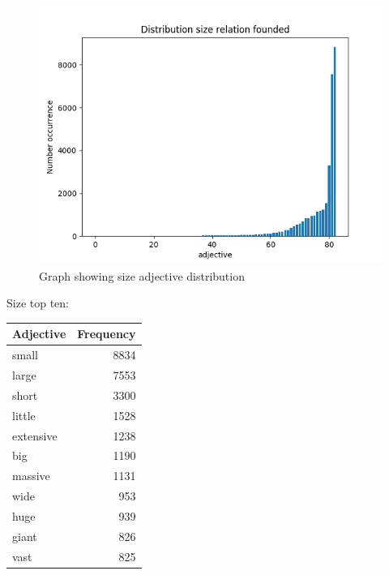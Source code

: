 \documentclass[conference,compsoc]{IEEEtran}
\begin{document}
\begin{figure}[h]
\centering
\includegraphics[scale=0.52]{size_plot}
\caption{ Graph showing size adjective distribution}
\end{figure}

Size top ten:
\begin{tabular}{lr}
\hline
 Adjective   &   Frequency \\
\hline
 small       &        8834 \\
 large       &        7553 \\
 short       &        3300 \\
 little      &        1528 \\
 extensive   &        1238 \\
 big         &        1190 \\
 massive     &        1131 \\
 wide        &         953 \\
 huge        &         939 \\
 giant       &         826 \\
 vast        &         825 \\
\hline
\end{tabular}
\end{document}
